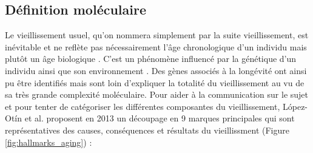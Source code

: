 \subsection{Définition moléculaire}

Le vieillissement usuel, qu'on nommera simplement par la suite vieillissement, est inévitable et ne reflète pas nécessairement l'âge chronologique d'un individu mais plutôt un âge biologique \cite{Horvath2013Oct}. C'est un phénomène influencé par la génétique d'un individu \cite{Khan2017Aug, deMagalhaes2003Mar} ainsi que son environnement \cite{Jones2015Dec}. Des gènes associés à la longévité ont ainsi pu être identifiés mais sont loin d'expliquer la totalité du vieillissement au vu de sa très grande complexité moléculaire. Pour aider à la communication sur le sujet et pour tenter de catégoriser les différentes composantes du vieillissement, López-Otín et al. proposent en 2013 un découpage en 9 marques principales qui sont représentatives des causes, conséquences et résultats du vieillissment (Figure \ref{fig:hallmarks_aging}) \cite{Lopez-Otin2013} : 
